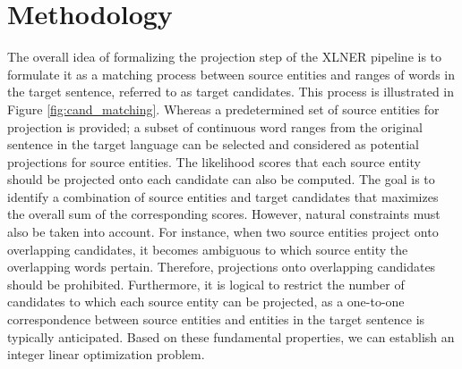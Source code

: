 \chapter{Methodology}
\label{sec:methodology}
The overall idea of formalizing the projection step of the XLNER pipeline is
to formulate it as a matching process between source entities and ranges
of words in the target sentence, referred to as target candidates. This process is
illustrated in Figure \ref{fig:cand_matching}. Whereas a predetermined set of source entities
for projection is provided; a subset of continuous word ranges from the original
sentence in the target language can be selected and considered as potential
projections for source entities. The likelihood scores that each source entity
should be projected onto each candidate can also be computed. The goal is to identify a
combination of source entities and target candidates that maximizes the overall
sum of the corresponding scores. However, natural constraints must also be taken into account.
For instance, when two source entities project onto overlapping candidates, it becomes
ambiguous to which source entity the overlapping words pertain. Therefore, projections
onto overlapping candidates should be prohibited. Furthermore, it is logical to
restrict the number of candidates to which each source entity can be projected,
as a one-to-one correspondence between source entities and entities in the
target sentence is typically anticipated. Based on these fundamental properties,
we can establish an integer linear optimization problem.

